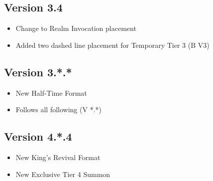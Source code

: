 \documentclass[12pt, letterpaper]{article}
\begin{document}
\subsection{Version 3.4}
\begin{itemize}
    \item Change to Realm Invocation placement
    \item Added two dashed line placement for Temporary Tier 3 (B V3)
\end{itemize}
%
\subsection{Version 3.*.*}
\begin{itemize}
    \item New Half-Time Format 
    \item Follows all following (V *.*)
\end{itemize}
%
\subsection{Version 4.*.4}
\begin{itemize}
    \item New King's Revival Format
    \item New Exclusive Tier 4 Summon
\end{itemize}
\end{document}
